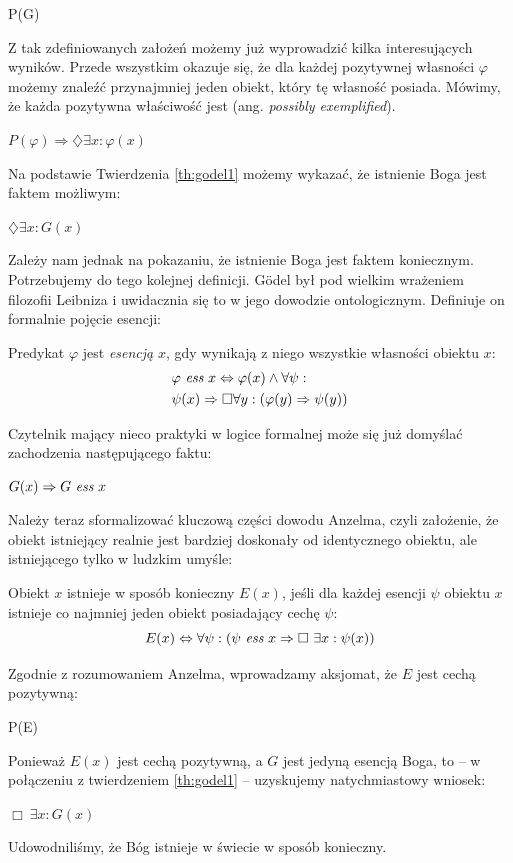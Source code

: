 \documentclass[12pt]{article}
\begin{document}
\begin{multicols}{2}
\begin{axiom-g} \label{axiom:godel4}
	P(G)
\end{axiom-g}
Z tak zdefiniowanych założeń możemy już wyprowadzić kilka interesujących wyników. Przede wszystkim okazuje się, że dla każdej pozytywnej własności $\varphi$ możemy znaleźć przynajmniej jeden obiekt, który tę własność posiada. Mówimy, że każda pozytywna właściwość jest  (ang. \emph{possibly exemplified}). 
\begin{theorem-g} \label{th:godel1}
	$P(\varphi) \Rightarrow \diamondsuit \exists x: \varphi(x)$
\end{theorem-g}
Na podstawie Twierdzenia \ref{th:godel1} możemy wykazać, że istnienie Boga jest faktem możliwym:
\begin{theorem-g} \label{th:godel2}
	$\diamondsuit \exists x: G(x)$
\end{theorem-g}
Zależy nam jednak na pokazaniu, że istnienie Boga jest faktem koniecznym. Potrzebujemy do tego kolejnej definicji. G\"odel był pod wielkim wrażeniem filozofii Leibniza i uwidacznia się to w jego dowodzie ontologicznym. Definiuje on formalnie pojęcie esencji:
\begin{definition-g}
	Predykat $\varphi$ jest \emph{esencją} $x$, gdy wynikają z niego wszystkie własności obiektu $x$:
	\begin{align*}
	& \varphi\ \emph{ess}\ x \Leftrightarrow \varphi(x) \wedge \forall \psi: \\ 
	& \psi(x) \Rightarrow \Box \forall y: \left( \varphi(y) \Rightarrow \psi(y) \right)
	\end{align*}
\end{definition-g}
Czytelnik mający nieco praktyki w logice formalnej może się już domyślać zachodzenia następującego faktu:
\begin{corollary}
	$G(x) \Rightarrow G\ \emph{ess}\ x$
\end{corollary}
Należy teraz sformalizować kluczową części dowodu Anzelma, czyli założenie, że obiekt istniejący realnie jest bardziej doskonały od identycznego obiektu, ale istniejącego tylko w ludzkim umyśle: 
\begin{definition-g}
	Obiekt $x$ istnieje w sposób konieczny $E(x)$, jeśli dla każdej esencji $\psi$ obiektu $x$ istnieje co najmniej jeden obiekt posiadający cechę $\psi$:
	\begin{equation*}
	E(x) \Leftrightarrow \forall \psi: \left( \psi\ \emph{ess}\ x \Rightarrow\Box\ \exists x: \psi(x) \right)
	\end{equation*}
\end{definition-g}
Zgodnie z rozumowaniem Anzelma, wprowadzamy aksjomat, że $E$ jest cechą pozytywną:
\begin{axiom-g}
	P(E)
\end{axiom-g}
Ponieważ $E(x)$ jest cechą pozytywną, a $G$ jest jedyną esencją Boga, to -- w połączeniu z twierdzeniem \ref{th:godel1} -- uzyskujemy natychmiastowy wniosek:
\begin{theorem-g}
	$\Box\ \exists x: G(x)$
\end{theorem-g}
Udowodniliśmy, że Bóg istnieje w świecie w sposób konieczny. 


\end{multicols}
\end{document}
